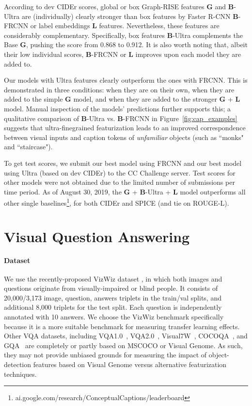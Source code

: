 \documentclass[11pt,a4paper]{article}
\begin{document}
According to dev CIDEr scores, global or box Graph-RISE features {\bf G} and {\bf B}-Ultra are (individually) clearly stronger than box features by Faster R-CNN {\bf B}-FRCNN or label embeddings {\bf L} features.
Nevertheless, these features are considerably complementary.
Specifically, box features {\bf B}-Ultra complements the Base {\bf G}, pushing the score from 0.868 to 0.912.
It is also worth noting that, albeit their low individual scores, {\bf B}-FRCNN or {\bf L} improves upon each model they are added to.

Our models with Ultra features clearly outperform the ones with FRCNN.
This is demonstrated in three conditions: when they are on their own, when they are added to the simple {\bf G} model, and when they are added to the stronger {\bf G} + {\bf L} model.
Manual inspection of the models' predictions further supports this;
a qualitative comparison of {\bf B}-Ultra vs. {\bf B}-FRCNN in Figure~\ref{fig:cap_examples} suggests that
ultra-finegrained featurization leads to an improved correspondence between visual inputs and caption tokens of \emph{unfamiliar} objects (such as ``monks" and ``staircase").

To get test scores, we submit our best model using FRCNN and our best model using Ultra (based on dev CIDEr) to the CC Challenge server.
Test scores for other models were not obtained due to the limited number of submissions per time period.
As of August 30, 2019, the {\bf G} + {\bf B}-Ultra + {\bf L} model outperforms all other single baselines\footnote{ai.google.com/research/ConceptualCaptions/leaderboard}, for both CIDEr and SPICE (and tie on ROUGE-L).
 \section{Visual Question Answering}
\label{sec:vqa}

\paragraph{Dataset}
We use the recently-proposed VizWiz dataset \cite{gurari18vizwiz}, in which both images and questions originate from visually-impaired or blind people.
It consists of 20,000/3,173 image, question, answers triplets in the train/val splits, and additional 8,000 triplets for the test split.
Each question is independently annotated with 10 answers.
We choose the VizWiz benchmark specifically because it is a more suitable benchmark for measuring transfer learning effects.
Other VQA datasets, including VQA1.0~\cite{antol15vqa}, VQA2.0~\cite{goyal17vqa2}, Visual7W~\cite{zhu16visual7w}, COCOQA~\cite{ren15cocoqa}, and GQA~\cite{hudson19gqa} are completely or partly based on MSCOCO or Visual Genome.
As such, they may not provide unbiased grounds for measuring the impact of object-detection features based on Visual Genome versus alternative featurization techniques.
\end{document}
